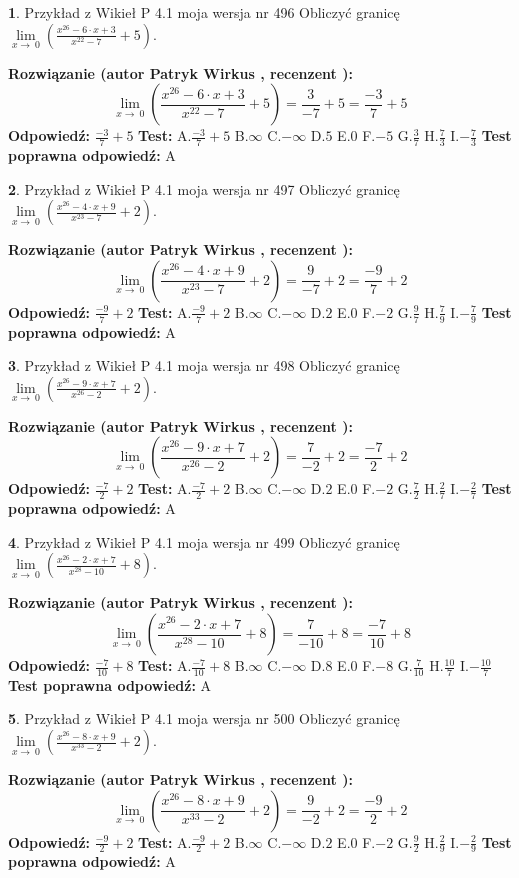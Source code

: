 \documentclass[12pt, a4paper]{article}
\theoremstyle{definition} %
\newtheorem{zad}{}
\newcommand{\zadStart}[1]{\begin{zad}#1\newline}
\newcommand{\zadStop}{\end{zad}}
\newcommand{\rozwStart}[2]{\noindent \textbf{Rozwiązanie (autor #1 , recenzent #2): }\newline}
\newcommand{\rozwStop}{\newline}
\newcommand{\odpStart}{\noindent \textbf{Odpowiedź:}\newline}
\newcommand{\odpStop}{\newline}
\newcommand{\testStart}{\noindent \textbf{Test:}\newline}
\newcommand{\testStop}{\newline}
\newcommand{\kluczStart}{\noindent \textbf{Test poprawna odpowiedź:}\newline}
\newcommand{\kluczStop}{\newline}
\begin{document}
\zadStart{Przykład z Wikieł P 4.1 moja wersja nr 496}
Obliczyć granicę $\lim\limits_{x\to\ 0}(\frac{x^{26}-6 \cdot x +3}{x^{22}-7}+5)$.
\zadStop
\rozwStart{Patryk Wirkus}{}
$$\lim\limits_{x\to\ 0}(\frac{x^{26}-6 \cdot x +3}{x^{22}-7}+5)=\frac{3}{-7}+5=\frac{-3}{7}+5$$
\rozwStop
\odpStart
$\frac{-3}{7}+5$
\odpStop
\testStart
A.$\frac{-3}{7}+5$
B.$\infty$
C.$-\infty$
D.$5$
E.$0$
F.$-5$
G.$\frac{3}{7}$
H.$\frac{7}{3}$
I.$-\frac{7}{3}$
\testStop
\kluczStart
A
\kluczStop



\zadStart{Przykład z Wikieł P 4.1 moja wersja nr 497}
Obliczyć granicę $\lim\limits_{x\to\ 0}(\frac{x^{26}-4 \cdot x +9}{x^{23}-7}+2)$.
\zadStop
\rozwStart{Patryk Wirkus}{}
$$\lim\limits_{x\to\ 0}(\frac{x^{26}-4 \cdot x +9}{x^{23}-7}+2)=\frac{9}{-7}+2=\frac{-9}{7}+2$$
\rozwStop
\odpStart
$\frac{-9}{7}+2$
\odpStop
\testStart
A.$\frac{-9}{7}+2$
B.$\infty$
C.$-\infty$
D.$2$
E.$0$
F.$-2$
G.$\frac{9}{7}$
H.$\frac{7}{9}$
I.$-\frac{7}{9}$
\testStop
\kluczStart
A
\kluczStop



\zadStart{Przykład z Wikieł P 4.1 moja wersja nr 498}
Obliczyć granicę $\lim\limits_{x\to\ 0}(\frac{x^{26}-9 \cdot x +7}{x^{26}-2}+2)$.
\zadStop
\rozwStart{Patryk Wirkus}{}
$$\lim\limits_{x\to\ 0}(\frac{x^{26}-9 \cdot x +7}{x^{26}-2}+2)=\frac{7}{-2}+2=\frac{-7}{2}+2$$
\rozwStop
\odpStart
$\frac{-7}{2}+2$
\odpStop
\testStart
A.$\frac{-7}{2}+2$
B.$\infty$
C.$-\infty$
D.$2$
E.$0$
F.$-2$
G.$\frac{7}{2}$
H.$\frac{2}{7}$
I.$-\frac{2}{7}$
\testStop
\kluczStart
A
\kluczStop



\zadStart{Przykład z Wikieł P 4.1 moja wersja nr 499}
Obliczyć granicę $\lim\limits_{x\to\ 0}(\frac{x^{26}-2 \cdot x +7}{x^{28}-10}+8)$.
\zadStop
\rozwStart{Patryk Wirkus}{}
$$\lim\limits_{x\to\ 0}(\frac{x^{26}-2 \cdot x +7}{x^{28}-10}+8)=\frac{7}{-10}+8=\frac{-7}{10}+8$$
\rozwStop
\odpStart
$\frac{-7}{10}+8$
\odpStop
\testStart
A.$\frac{-7}{10}+8$
B.$\infty$
C.$-\infty$
D.$8$
E.$0$
F.$-8$
G.$\frac{7}{10}$
H.$\frac{10}{7}$
I.$-\frac{10}{7}$
\testStop
\kluczStart
A
\kluczStop



\zadStart{Przykład z Wikieł P 4.1 moja wersja nr 500}
Obliczyć granicę $\lim\limits_{x\to\ 0}(\frac{x^{26}-8 \cdot x +9}{x^{33}-2}+2)$.
\zadStop
\rozwStart{Patryk Wirkus}{}
$$\lim\limits_{x\to\ 0}(\frac{x^{26}-8 \cdot x +9}{x^{33}-2}+2)=\frac{9}{-2}+2=\frac{-9}{2}+2$$
\rozwStop
\odpStart
$\frac{-9}{2}+2$
\odpStop
\testStart
A.$\frac{-9}{2}+2$
B.$\infty$
C.$-\infty$
D.$2$
E.$0$
F.$-2$
G.$\frac{9}{2}$
H.$\frac{2}{9}$
I.$-\frac{2}{9}$
\testStop
\kluczStart
A
\kluczStop
\end{document}
